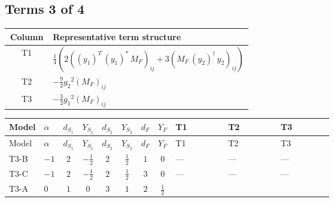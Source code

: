 \documentclass[8pt]{article}
\begin{document}
\begin{landscape}
\subsection*{Terms 3 of 4}
\begin{center}
\begin{tabular}{@{}c >{\raggedright\arraybackslash}p{0.82\linewidth}@{}}
\toprule
Column & Representative term structure \\
\midrule
T1 & \(\displaystyle \frac{1}{4} (2 \left(\left({y_1}\right)^{T}\,\left({y_1}\right)^{*}\,{M_F}\right)_{ij}+3 \left({M_F}\,\left({y_2}\right)^{\dagger}\,{y_2}\right)_{ij})\) \\
\midrule
T2 & \(\displaystyle -\frac{9}{2} {g_2}^2 \left({M_F}\right)_{ij}\) \\
\midrule
T3 & \(\displaystyle -\frac{3}{2} {g_1}^2 \left({M_F}\right)_{ij}\) \\
\midrule
\bottomrule
\end{tabular}
\end{center}
\smallskip
\tiny
\begin{longtable}{@{}llcccccc >{\raggedright\arraybackslash}p{0.21\linewidth} >{\raggedright\arraybackslash}p{0.21\linewidth} >{\raggedright\arraybackslash}p{0.21\linewidth}@{}}
\toprule
Model & $\alpha$ & $d_{S_1}$ & $Y_{S_1}$ & $d_{S_2}$ & $Y_{S_2}$ & $d_F$ & $Y_F$ & T1 & T2 & T3 \\
\midrule
\endfirsthead
\toprule
Model & $\alpha$ & $d_{S_1}$ & $Y_{S_1}$ & $d_{S_2}$ & $Y_{S_2}$ & $d_F$ & $Y_F$ & T1 & T2 & T3 \\
\midrule
\endhead
T3-B & $-1$ & $2$ & $-\frac{1}{2}$ & $2$ & $\frac{1}{2}$ & $1$ & $0$ & --- & --- & --- \\
\midrule
T3-C & $-1$ & $2$ & $-\frac{1}{2}$ & $2$ & $\frac{1}{2}$ & $3$ & $0$ & --- & --- & --- \\
\midrule
T3-A & $0$ & $1$ & $0$ & $3$ & $1$ & $2$ & $\frac{1}{2}$ & \scriptsize\adjustbox{max width=\linewidth}{$\begin{gathered} \frac{1}{4} (2 \left(\left({y_1}\right)^{T}\,\left({y_1}\right)^{*}\,{M_F}\right)_{ij}+3 \left({M_F}\,\left({y_2}\right)^{\dagger}\,{y_2}\right)_{ij})\end{gathered}$} & \scriptsize\adjustbox{max width=\linewidth}{$\begin{gathered} -\frac{9}{2} {g_2}^2 \left({M_F}\right)_{ij}\end{gathered}$} & \scriptsize\adjustbox{max width=\linewidth}{$\begin{gathered} -\frac{3}{2} {g_1}^2 \left({M_F}\right)_{ij}\end{gathered}$} \\

\end{longtable}
\end{landscape}
\end{document}
